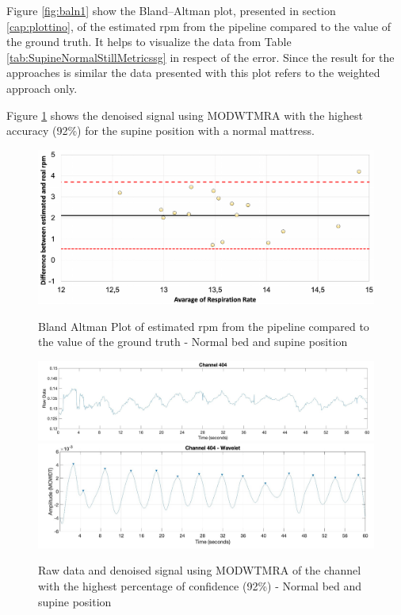 

Figure \ref{fig:baln1} show the Bland–Altman plot, presented in section \ref{cap:plottino}, of the estimated rpm from the pipeline compared to the value of the ground truth. It helps to visualize the data from Table \ref{tab:SupineNormalStillMetricssg} in respect of the error. Since the result for the approaches is similar the data presented with this plot refers to the weighted approach only.

Figure \ref{fig:rec} shows the denoised signal using MODWTMRA with the highest accuracy (92\%) for the supine position with a normal mattress.

\begin{figure}[p]
  \centering
  \includegraphics[width=\textwidth]{img/balnd1.pdf}

  \caption{Bland Altman Plot of estimated rpm from the pipeline compared to the value of the ground truth - Normal bed and supine position}
  \label{fig:baln1}
  \vspace{1.5cm}
  \includegraphics[width=\textwidth]{img/404.jpg}
  \includegraphics[width=\textwidth]{img/404_wave.jpg}
\caption{Raw data and denoised signal using MODWTMRA of the channel with the highest percentage of confidence (92\%) - Normal bed and supine position}
  \label{fig:rec}
\end{figure}


